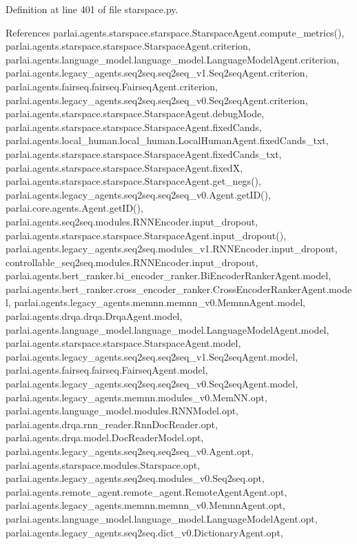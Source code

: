 Definition at line 401 of file starspace.\+py.



References parlai.\+agents.\+starspace.\+starspace.\+Starspace\+Agent.\+compute\+\_\+metrics(), parlai.\+agents.\+starspace.\+starspace.\+Starspace\+Agent.\+criterion, parlai.\+agents.\+language\+\_\+model.\+language\+\_\+model.\+Language\+Model\+Agent.\+criterion, parlai.\+agents.\+legacy\+\_\+agents.\+seq2seq.\+seq2seq\+\_\+v1.\+Seq2seq\+Agent.\+criterion, parlai.\+agents.\+fairseq.\+fairseq.\+Fairseq\+Agent.\+criterion, parlai.\+agents.\+legacy\+\_\+agents.\+seq2seq.\+seq2seq\+\_\+v0.\+Seq2seq\+Agent.\+criterion, parlai.\+agents.\+starspace.\+starspace.\+Starspace\+Agent.\+debug\+Mode, parlai.\+agents.\+starspace.\+starspace.\+Starspace\+Agent.\+fixed\+Cands, parlai.\+agents.\+local\+\_\+human.\+local\+\_\+human.\+Local\+Human\+Agent.\+fixed\+Cands\+\_\+txt, parlai.\+agents.\+starspace.\+starspace.\+Starspace\+Agent.\+fixed\+Cands\+\_\+txt, parlai.\+agents.\+starspace.\+starspace.\+Starspace\+Agent.\+fixedX, parlai.\+agents.\+starspace.\+starspace.\+Starspace\+Agent.\+get\+\_\+negs(), parlai.\+agents.\+legacy\+\_\+agents.\+seq2seq.\+seq2seq\+\_\+v0.\+Agent.\+get\+I\+D(), parlai.\+core.\+agents.\+Agent.\+get\+I\+D(), parlai.\+agents.\+seq2seq.\+modules.\+R\+N\+N\+Encoder.\+input\+\_\+dropout, parlai.\+agents.\+starspace.\+starspace.\+Starspace\+Agent.\+input\+\_\+dropout(), parlai.\+agents.\+legacy\+\_\+agents.\+seq2seq.\+modules\+\_\+v1.\+R\+N\+N\+Encoder.\+input\+\_\+dropout, controllable\+\_\+seq2seq.\+modules.\+R\+N\+N\+Encoder.\+input\+\_\+dropout, parlai.\+agents.\+bert\+\_\+ranker.\+bi\+\_\+encoder\+\_\+ranker.\+Bi\+Encoder\+Ranker\+Agent.\+model, parlai.\+agents.\+bert\+\_\+ranker.\+cross\+\_\+encoder\+\_\+ranker.\+Cross\+Encoder\+Ranker\+Agent.\+model, parlai.\+agents.\+legacy\+\_\+agents.\+memnn.\+memnn\+\_\+v0.\+Memnn\+Agent.\+model, parlai.\+agents.\+drqa.\+drqa.\+Drqa\+Agent.\+model, parlai.\+agents.\+language\+\_\+model.\+language\+\_\+model.\+Language\+Model\+Agent.\+model, parlai.\+agents.\+starspace.\+starspace.\+Starspace\+Agent.\+model, parlai.\+agents.\+legacy\+\_\+agents.\+seq2seq.\+seq2seq\+\_\+v1.\+Seq2seq\+Agent.\+model, parlai.\+agents.\+fairseq.\+fairseq.\+Fairseq\+Agent.\+model, parlai.\+agents.\+legacy\+\_\+agents.\+seq2seq.\+seq2seq\+\_\+v0.\+Seq2seq\+Agent.\+model, parlai.\+agents.\+legacy\+\_\+agents.\+memnn.\+modules\+\_\+v0.\+Mem\+N\+N.\+opt, parlai.\+agents.\+language\+\_\+model.\+modules.\+R\+N\+N\+Model.\+opt, parlai.\+agents.\+drqa.\+rnn\+\_\+reader.\+Rnn\+Doc\+Reader.\+opt, parlai.\+agents.\+drqa.\+model.\+Doc\+Reader\+Model.\+opt, parlai.\+agents.\+legacy\+\_\+agents.\+seq2seq.\+seq2seq\+\_\+v0.\+Agent.\+opt, parlai.\+agents.\+starspace.\+modules.\+Starspace.\+opt, parlai.\+agents.\+legacy\+\_\+agents.\+seq2seq.\+modules\+\_\+v0.\+Seq2seq.\+opt, parlai.\+agents.\+remote\+\_\+agent.\+remote\+\_\+agent.\+Remote\+Agent\+Agent.\+opt, parlai.\+agents.\+legacy\+\_\+agents.\+memnn.\+memnn\+\_\+v0.\+Memnn\+Agent.\+opt, parlai.\+agents.\+language\+\_\+model.\+language\+\_\+model.\+Language\+Model\+Agent.\+opt, parlai.\+agents.\+legacy\+\_\+agents.\+seq2seq.\+dict\+\_\+v0.\+Dictionary\+Agent.\+opt, 